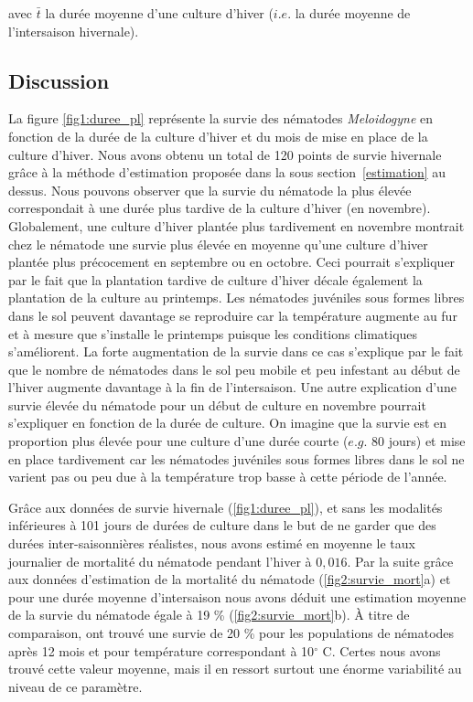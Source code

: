 	
\noindent  avec $\bar{t}$ la durée moyenne d'une culture d'hiver ($i.e.$ la durée moyenne  de l'intersaison hivernale).
	
	
	
\subsection{Discussion}
	
	
	La figure \ref{fig1:duree_pl} représente la survie des nématodes \textit{Meloidogyne} en fonction de la durée de la culture d'hiver et du mois de mise en place de la culture d'hiver. Nous avons obtenu un total de 120 points de survie hivernale grâce à la méthode d'estimation proposée dans la sous section~\ref{estimation} au dessus. Nous pouvons observer que la survie du nématode la plus élevée correspondait à une durée plus tardive de la culture d'hiver (en novembre).  Globalement, une culture d'hiver plantée plus tardivement en novembre  montrait chez le nématode   une survie plus élevée  en moyenne  qu'une culture  d'hiver plantée plus précocement  en septembre   ou  en octobre. Ceci pourrait s'expliquer par le fait que la plantation  tardive de culture d'hiver décale également la plantation de la culture au printemps. Les nématodes juvéniles sous formes libres dans le sol peuvent davantage se reproduire car la température augmente  au fur et à mesure que s'installe le printemps puisque les conditions climatiques s'améliorent.  La forte augmentation de la survie dans ce cas s'explique par le fait que le nombre de nématodes dans le sol peu mobile et peu infestant au début de l'hiver  augmente davantage à la fin de l'intersaison. Une autre explication d'une survie élevée du nématode pour un début de culture en novembre pourrait s’expliquer en fonction de la durée de culture. On imagine que  la survie est en proportion plus élevée pour une culture d'une durée courte  ($e.g.$ 80 jours) et mise en place tardivement    car  les nématodes juvéniles sous formes libres dans le sol ne varient pas ou peu due à la température trop basse à cette période de l’année. 
		 
	Grâce aux données de survie hivernale (\autoref{fig1:duree_pl}), et sans les modalités inférieures à 101 jours de durées de culture dans le but de ne garder que des durées inter-saisonnières réalistes, nous avons estimé en moyenne le taux journalier de  mortalité du nématode  pendant l'hiver à $0,016$. Par la suite grâce aux données d'estimation de la mortalité du nématode (\autoref{fig2:survie_mort}a) et pour une durée moyenne d'intersaison nous avons  déduit une estimation moyenne de la survie du nématode  égale à 19 \% (\autoref{fig2:survie_mort}b). À titre de comparaison,  \citet{Bergeson1959} ont trouvé  une survie de 20 \% pour les populations de nématodes  après 12 mois et pour température correspondant à 10$^{\circ}$ C. 
Certes nous avons trouvé cette valeur moyenne, mais il en ressort surtout une énorme variabilité au niveau de ce paramètre. 
	
